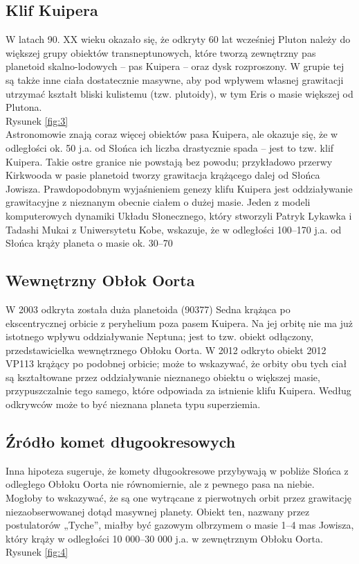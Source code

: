 \documentclass[12pt]{article}
\begin{document}
\subsection{Klif Kuipera}
W latach 90. XX wieku okazało się, że odkryty 60 lat wcześniej Pluton należy do większej grupy obiektów transneptunowych, które tworzą zewnętrzny pas planetoid skalno-lodowych – pas Kuipera – oraz dysk rozproszony. W grupie tej są także inne ciała dostatecznie masywne, aby pod wpływem własnej grawitacji utrzymać kształt bliski kulistemu (tzw. plutoidy), w tym Eris o masie większej od Plutona.\\
Rysunek \ref{fig:3}\\
Astronomowie znają coraz więcej obiektów pasa Kuipera, ale okazuje się, że w odległości ok. 50 j.a. od Słońca ich liczba drastycznie spada – jest to tzw. klif Kuipera. Takie ostre granice nie powstają bez powodu; przykładowo przerwy Kirkwooda w pasie planetoid tworzy grawitacja krążącego dalej od Słońca Jowisza. Prawdopodobnym wyjaśnieniem genezy klifu Kuipera jest oddziaływanie grawitacyjne z nieznanym obecnie ciałem o dużej masie. Jeden z modeli komputerowych dynamiki Układu Słonecznego, który stworzyli Patryk Lykawka i Tadashi Mukai z Uniwersytetu Kobe, wskazuje, że w odległości 100–170 j.a. od Słońca krąży planeta o masie ok. 30–70%

\subsection{Wewnętrzny Obłok Oorta}
W 2003 odkryta została duża planetoida (90377) Sedna krążąca po ekscentrycznej orbicie z peryhelium poza pasem Kuipera. Na jej orbitę nie ma już istotnego wpływu oddziaływanie Neptuna; jest to tzw. obiekt odłączony, przedstawicielka wewnętrznego Obłoku Oorta. W 2012 odkryto obiekt 2012 VP113 krążący po podobnej orbicie; może to wskazywać, że orbity obu tych ciał są kształtowane przez oddziaływanie nieznanego obiektu o większej masie, przypuszczalnie tego samego, które odpowiada za istnienie klifu Kuipera. Według odkrywców może to być nieznana planeta typu superziemia.\\

\subsection{Źródło komet długookresowych}
Inna hipoteza sugeruje, że komety długookresowe przybywają w pobliże Słońca z odległego Obłoku Oorta nie równomiernie, ale z pewnego pasa na niebie. Mogłoby to wskazywać, że są one wytrącane z pierwotnych orbit przez grawitację niezaobserwowanej dotąd masywnej planety. Obiekt ten, nazwany przez postulatorów „Tyche”, miałby być gazowym olbrzymem o masie 1–4 mas Jowisza, który krąży w odległości 10 000–30 000 j.a. w zewnętrznym Obłoku Oorta.\\
 Rysunek \ref{fig:4}\\
\end{document}
